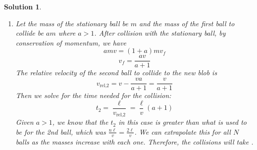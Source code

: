 \documentclass[12pt]{article}
\newtheorem*{solution}{Solution}
\theoremstyle{mystyle}
\begin{document}
\begin{solution}
\begin{enumerate}[label=\Alph*)]
        \item Let the mass of the stationary ball be $m$ and the mass of the first ball to collide be $am$ where $a > 1$. After collision with the stationary ball, by conservation of momentum, we have 
        \[amv = (1+a)mv_f\]
        \[v_f = \frac{av}{a+1}\]
        The relative velocity of the second ball to collide to the new blob is  \[
            v_\text{rel,2}=v-\dfrac{va}{a+1}=\dfrac{v}{a+1}
        \]
        Then we solve for the time needed for the collision: \[
            t_2=\dfrac{\ell}{v_\text{rel,2}}=\dfrac{\ell}{v}(a+1)
        \]
        Given $a > 1$, we know that the $t_2$ in this case is greater than what is used to be for the 2nd ball, which was $\frac{n\ell}{v} = \frac{2\ell}{v}$. We can extrapolate this for all $N$ balls as the masses increase with each one. Therefore, the collisions will take .
        
    \end{enumerate}
\end{solution}
\end{document}
